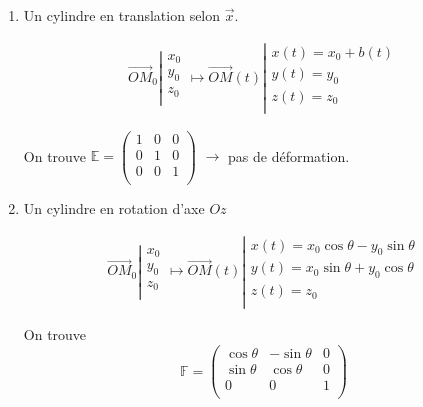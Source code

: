 \documentclass{article}
\begin{document}
\begin{enumerate}
\item
Un cylindre en translation selon $\vec{x}$.

\begin{align*}
\overrightarrow{OM}_0 \left\lvert \begin{matrix}
x_0\\
y_0\\
z_0\\
\end{matrix} \right. \longmapsto 
\overrightarrow{OM}(t) \left\lvert \begin{matrix}
x(t) = x_0 + b(t)\\
y(t) = y_0\\
z(t) = z_0\\
\end{matrix} \right.
\end{align*}

On trouve $\mathbb{E} = \begin{pmatrix}
1 & 0 & 0 \\
0 & 1 & 0 \\
0 & 0 & 1 \\
\end{pmatrix}$ $\to$ pas de déformation.

\item 
Un cylindre en rotation d'axe $Oz$

\begin{align*}
\overrightarrow{OM}_0 \left\lvert \begin{matrix}
x_0\\
y_0\\
z_0\\
\end{matrix} \right. \longmapsto 
\overrightarrow{OM}(t) \left\lvert \begin{matrix}
x(t) = x_0 \cos\theta - y_0\sin \theta\\
y(t) = x_0\sin\theta + y_0\cos \theta\\
z(t) = z_0\\
\end{matrix} \right.
\end{align*}

On trouve 
\[ \mathbb{F} = \begin{pmatrix}
\cos\theta & -\sin\theta & 0\\
\sin\theta & \cos\theta & 0\\
0 & 0 & 1\\
\end{pmatrix}
\]


\end{enumerate}
\end{document}
